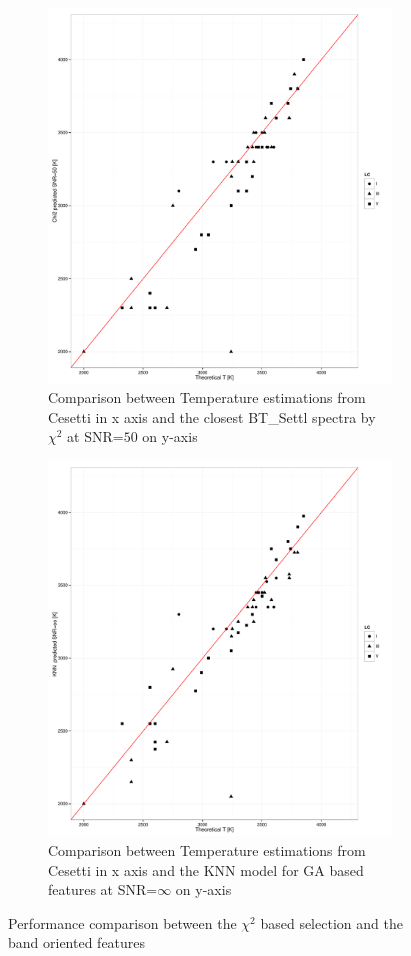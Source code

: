 \begin {figure}
 \centering
 \begin{subfigure}{.85\textwidth}
  \centering
  \includegraphics[width=11cm]{figs/irtf_T_chi250_Cesetti.pdf}
  \caption{Comparison between Temperature estimations from Cesetti 
  in x axis and the closest BT\_Settl spectra by $\chi^2$ at SNR=$50$ on y-axis}
 \label{fig:chi2_50_spt}
 \end{subfigure}
  \begin{subfigure}{.85\textwidth}
  \centering
  \includegraphics[width=11cm]{figs/irtf_T_knnoo_Cesetti.pdf}
  \caption{Comparison between Temperature estimations from Cesetti 
 in x axis and the KNN model for GA based features 
 at SNR=$\infty$ on y-axis}
 \label{fig:ga_too50ga_spt}
 \end{subfigure}
 \label {fig:comp01}
 \caption{Performance comparison between the $\chi^2$ based selection 
          and the band oriented features}
\end {figure}
 
